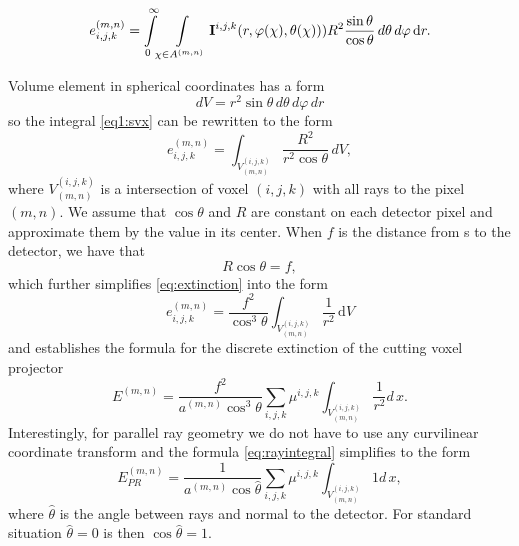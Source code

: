 \begin{equation}
     e_{i,j,k}^{(m,n)} = \int\limits_0^\infty \! \int\limits_{\chi \in A^{(m,n)}} \mathbf{I}^{i,j,k}(r, \varphi(\chi), \theta(\chi)))  R^2 \frac{\sin{\theta}}{\cos{\theta}} \,d\theta \,d\varphi  \, \mathrm{d} r.\label{eq1:svx}
\end{equation}

Volume element in spherical coordinates has a form
\begin{equation}
    dV = r^2 \sin{\theta} \,d\theta \,d\varphi \,dr
\end{equation}
so the integral \eqref{eq1:svx} can be rewritten to the form 
\begin{equation}
     e_{i,j,k}^{(m,n)} = \int_{V^{(i,j,k)}_{(m,n)}} \frac{R^2}{r^2\cos{\theta}}  \,dV,
     \label{eq:extinction}
\end{equation}
where $V^{(i,j,k)}_{(m,n)}$ is a intersection of voxel $(i, j, k)$ with all rays to the pixel $(m,n)$. 
We assume that $\cos{\theta}$ and $R$ are constant on each detector pixel and approximate them by the value in its center. When $f$ is the distance from s to the detector, we have that 
\begin{equation}
    R \cos{\theta} = f,
\end{equation}
which further simplifies \eqref{eq:extinction} into the form
\begin{equation}
     e_{i,j,k}^{(m,n)} =  \frac{f^2}{\cos^3{\theta}} \int_{V^{(i,j,k)}_{(m,n)}}  \frac{1}{r^2}  \,\mathrm{d}V
\end{equation}
and establishes the formula for the discrete extinction of the cutting voxel projector
\begin{equation}
    E^{(m,n)} = \frac{f^2}{a^{(m,n)} \cos^3{\theta}} \sum_{i,j,k} \mu^{i,j,k} \int_{V^{(i,j,k)}_{(m,n)}}  \frac{1}{r^2} d\,x. \label{cvp}
\end{equation}
Interestingly, for parallel ray geometry we do not have to use any curvilinear coordinate transform and the formula \eqref{eq:rayintegral} simplifies to the form
\begin{equation}
    E^{(m,n)}_{PR} = \frac{1}{a^{(m,n)} \cos{\hat{\theta}}} \sum_{i,j,k} \mu^{i,j,k} \int_{V^{(i,j,k)}_{(m,n)}}  1 d\,x,
    \label{eq1:extinciton_parallel}
\end{equation}
where $\hat{\theta}$ is the angle between rays and normal to the detector. For standard situation $\hat{\theta} = 0$ is then $\cos{\hat{\theta}}=1$.

